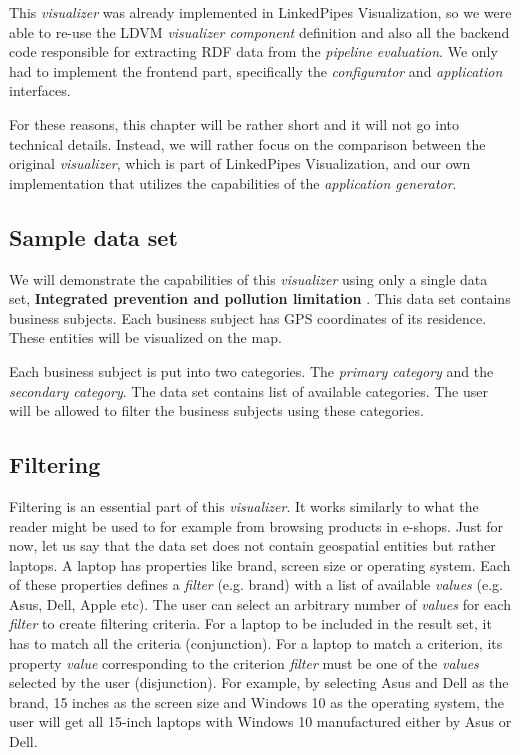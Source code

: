 This \emph{visualizer} was already implemented in LinkedPipes Visualization, so we were able to re-use the LDVM \emph{visualizer component} definition and also all the backend code responsible for extracting RDF data from the \emph{pipeline evaluation}. We only had to implement the frontend part, specifically the \emph{configurator} and \emph{application} interfaces.

For these reasons, this chapter will be rather short and it will not go into technical details. Instead, we will rather focus on the comparison between the original \emph{visualizer}, which is part of LinkedPipes Visualization, and our own implementation that utilizes the capabilities of the \emph{application generator}. 

\subsection{Sample data set}

We will demonstrate the capabilities of this \emph{visualizer} using only a single data set, \textbf{Integrated prevention and pollution limitation} \cite{prevention-and-pollution-limitation}. This data set contains business subjects. Each business subject has GPS coordinates of its residence. These entities will be visualized on the map.

Each business subject is put into two categories. The \emph{primary category} and the \emph{secondary category}. The data set contains list of available categories. The user will be allowed to filter the business subjects using these categories.

\subsection{Filtering}

Filtering is an essential part of this \emph{visualizer}. It works similarly to what the reader might be used to for example from browsing products in e-shops. Just for now, let us say that the data set does not contain geospatial entities but rather laptops. A laptop has properties like brand, screen size or operating system. Each of these properties defines a \emph{filter} (e.g. brand) with a list of available \emph{values} (e.g. Asus, Dell, Apple etc). The user can select an arbitrary number of \emph{values} for each \emph{filter} to create filtering criteria. For a laptop to be included in the result set, it has to match all the criteria (conjunction). For a laptop to match a criterion, its property \emph{value} corresponding to the criterion \emph{filter} must be one of the \emph{values} selected by the user (disjunction). For example, by selecting Asus and Dell as the brand, 15 inches as the screen size and Windows 10 as the operating system, the user will get all 15-inch laptops with Windows 10 manufactured either by Asus or Dell.

